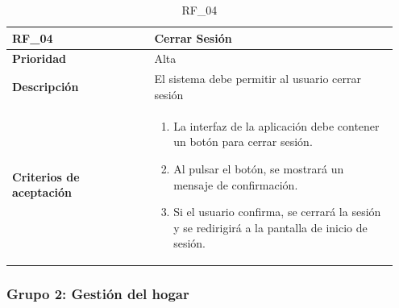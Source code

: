 \begin{table} [htb!]
    \begin{tabular}{|p{0.35\linewidth}|p{0.6\linewidth}|}
        \hline
        \rowcolor[HTML]{C0C0C0}  
        \textbf{RF\_04} & \textbf{Cerrar Sesión} \\
        \hline
        \textbf{Prioridad} & Alta \\
        \hline
        \textbf{Descripción} & El sistema debe permitir al usuario cerrar sesión  \\
        \hline
        \vspace{0.5mm}
        \textbf{Criterios de aceptación} & 
        \begin{minipage}[t]{0.9\linewidth}
            \begin{enumerate}
                \item La interfaz de la aplicación debe contener un botón para cerrar sesión.
                \item Al pulsar el botón, se mostrará un mensaje de confirmación.
                \item Si el usuario confirma, se cerrará la sesión y se redirigirá a la pantalla de inicio de sesión.
            \end{enumerate}
            \vspace{2mm}
        \end{minipage} \\
        \hline
    \end{tabular}
    \caption{RF\_04}

\end{table}

\clearpage

\subsubsection{Grupo 2: Gestión del hogar}
\label{subsubsec:grupo2}

